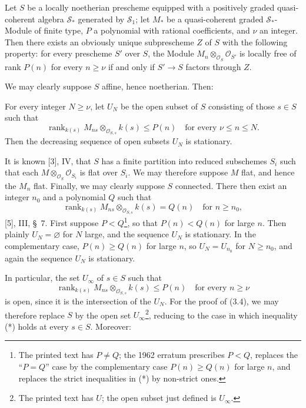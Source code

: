  Let $S$ be a locally noetherian prescheme equipped with a
positively graded quasi-coherent algebra $\mathcal S_*$ generated by
$\mathcal S_1$; let $M_*$ be a quasi-coherent graded $\mathcal S_*$-Module of
finite type, $P$ a polynomial with rational coefficients, and $\nu$ an
integer. Then there exists an obviously unique subprescheme $Z$ of $S$
with the following property: for every prescheme $S'$ over $S$, the Module
$M_n\otimes_{\mathcal O_S}\mathcal O_{S'}$ is locally free of rank $P(n)$ for
every $n\geq\nu$ if and only if $S'\longrightarrow S$ factors through $Z$.

We may clearly suppose $S$ affine, hence noetherian. Then:

 For every integer $N\geq\nu$, let $U_N$ be the open subset
of $S$ consisting of those $s\in S$ such that
\[
\operatorname{rank}_{k(s)}
M_{ns}\otimes_{\mathcal O_{S,s}}k(s)\leq P(n)
\quad\text{for every $\nu\leq n\leq N$}.
\]
Then the decreasing sequence of open subsets $U_N$ is stationary.

It is known [3], IV, that $S$ has a finite partition into reduced subschemes
$S_i$ such that each $M\otimes_{\mathcal O_S}\mathcal O_{S_i}$ is flat over
$S_i$. We may therefore suppose $M$ flat, and hence the $M_n$ flat. Finally,
we may clearly suppose $S$ connected. There then exist an integer $n_0$ and a
polynomial $Q$ such that
\[
\operatorname{rank}_{k(s)}
M_{ns}\otimes_{\mathcal O_{S,s}}k(s)=Q(n)
\quad\text{for $n\geq n_0$},
\]
[5], III, \S~7. First suppose $P<Q$\footnote{The printed text has
$P\neq Q$; the 1962 erratum prescribes $P<Q$, replaces the “$P=Q$” case by
the complementary case $P(n)\geq Q(n)$ for large $n$, and replaces the strict
inequalities in (*) by non-strict ones.}, so that $P(n)<Q(n)$ for large $n$.
Then plainly $U_N=\varnothing$ for $N$ large, and the sequence $U_N$ is
stationary. In the complementary case, $P(n)\geq Q(n)$ for large $n$, so
$U_N=U_{n_0}$ for $N\geq n_0$, and again the sequence $U_N$ is stationary.

In particular, the set $U_\infty$ of $s\in S$ such that
\[
\tag{*}
\operatorname{rank}_{k(s)}
M_{ns}\otimes_{\mathcal O_{S,s}}k(s)\leq P(n)
\quad\text{for every $n\geq\nu$}
\]
is open, since it is the intersection of the $U_N$. For the proof of (3.4), we
may therefore replace $S$ by the open set $U_\infty$\footnote{The printed text has $U$; the open subset just defined is $U_\infty$.}, reducing to the case in which
inequality (*) holds at every $s\in S$. Moreover:

